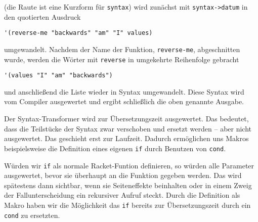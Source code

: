 (die Raute ist eine Kurzform für \texttt{syntax}) wird zunächst mit \texttt{syntax->datum} in den quotierten Ausdruck 

\begin{lstlisting}
'(reverse-me "backwards" "am" "I" values)
\end{lstlisting}


umgewandelt. Nachdem der Name der Funktion, \texttt{reverse-me}, abgeschnitten wurde, werden die Wörter mit \texttt{reverse} in umgekehrte Reihenfolge gebracht

\begin{lstlisting}
'(values "I" "am" "backwards")
\end{lstlisting}

und anschließend die Liste wieder in Syntax umgewandelt. Diese Syntax wird vom Compiler ausgewertet und ergibt schließlich die oben genannte Ausgabe.


Der Syntax-Transformer wird zur Übersetzungszeit ausgewertet. Das bedeutet, dass die Teilstücke der Syntax zwar verschoben und ersetzt werden -- aber nicht ausgewertet. Das geschieht erst zur Laufzeit. Dadurch ermöglichen uns Makros beispielsweise die Definition eines eigenen \texttt{if} durch Benutzen von \texttt{cond}.

Würden wir \texttt{if} als normale Racket-Funtion definieren, so würden alle Parameter ausgewertet, bevor sie überhaupt an die Funktion gegeben werden. Das wird spätestens dann sichtbar, wenn sie Seiteneffekte beinhalten oder in einem Zweig der Fallunterscheidung ein rekursiver Aufruf steckt. Durch die Definition als Makro haben wir die Möglichkeit das \texttt{if} bereits zur Übersetzungszeit durch ein \texttt{cond} zu ersetzten.

% 

